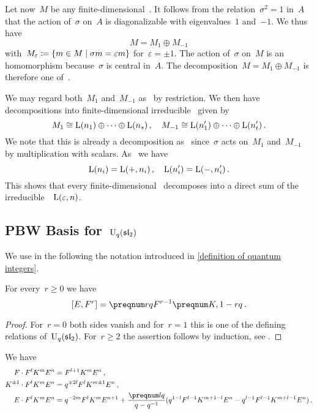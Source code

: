 \documentclass[a4paper, 11pt, oneside]{scrartcl}
\begin{document}
Let now~$M$ be any finite-dimensional~.
It follows from the relation~$\sigma^2 = 1$ in~$A$ that the action of~$\sigma$ on~$A$ is diagonalizable with eigenvalues~$1$ and~$-1$.
We thus have
\[
  M = M_{1} \oplus M_{-1}
\]
with~$M_\varepsilon \defined \{ m \in M \suchthat \sigma m = \varepsilon m \}$ for~$\varepsilon = \pm 1$.
The action of~$\sigma$ on~$M$ is an~ homomorphism because~$\sigma$ is central in~$A$.
The decomposition~$M = M_{1} \oplus M_{-1}$ is therefore one of~.

We may regard both~$M_1$ and~$M_{-1}$ as~ by restriction.
We then have decompositions into finite-dimensional irreducible~ given by
\[
  M_1
  \cong
  \operatorname{L}(n_1) \oplus \dotsb \oplus \operatorname{L}(n_s) \,,
  \quad
  M_{-1}
  \cong
  \operatorname{L}(n'_1) \oplus \dotsb \oplus \operatorname{L}(n'_t) \,.
\]
We note that this is already a decomposition as~ since~$\sigma$ acts on~$M_1$ and~$M_{-1}$ by multiplication with scalars.
As~ we have
\[
  \operatorname{L}(n_i) = \operatorname{L}(+, n_i) \,,
  \quad
  \operatorname{L}(n'_i) = \operatorname{L}(-, n'_i) \,.
\]
This shows that every finite-dimensional~ decomposes into a direct sum of the irreducible~~$\operatorname{L}(\varepsilon, n)$.




\subsection{PBW Basis for~$\operatorname{U}_q(\mathfrak{sl}_2)$}
\label{proof of quantum pbw}

We use in the following the notation introduced in \cref{definition of quantum integers}.

\begin{lemma}
  \label{generalized commutator relation for E and F}
  For every~$r \geq 0$ we have
  \[
    [E, F^r]
    =
    \qnum{r} F^{r-1} \qnum{K, 1-r} \,.
  \]
\end{lemma}

\begin{proof}
  For~$r = 0$ both sides vanish and for~$r = 1$ this is one of the defining relations of~$\operatorname{U}_q(\mathfrak{sl}_2)$.
  For~$r \geq 2$ the assertion follows by induction, see \cite[Appendix 1.3~(5)]{jantzen_quantum}.
\end{proof}

\begin{corollary}
  \label{technical formulas}
  We have
  \begin{align*}
    F \cdot F^l K^m E^n
    &=
    F^{l+1} K^m E^n \,,
    \\
    K^{\pm 1} \cdot F^l K^m E^n
    &=
    q^{\mp 2l} F^l K^{m \pm 1} E^n \,,
    \\
    E \cdot F^l K^m E^n
    &=
    q^{-2m} F^l K^m E^{n+1}
    +
    \frac{\qnum{l}}{q - q^{-1}}
    (
      q^{1-l} F^{l-1} K^{m + 1-l} E^n
      -
      q^{l-1} F^{l-1} K^{m + l-1} E^n
    ) \,.
  \end{align*}
\end{corollary}
\end{document}
